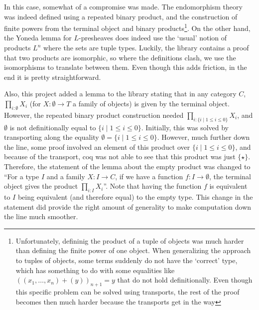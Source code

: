 In this case, somewhat of a compromise was made. The endomorphism theory was indeed defined using a repeated binary product, and the construction of finite powers from the terminal object and binary products\footnote{Unfortunately, defininig the product of a tuple of objects was much harder than defining the finite power of one object. When generalizing the approach to tuples of objects, some terms suddenly do not have the `correct' type, which has something to do with some equalities like $ ((x_1, \dots, x_n) + (y))_{n + 1} = y $ that do not hold definitionally. Even though this specific problem can be solved using transports, the rest of the proof becomes then much harder because the transports get in the way}. On the other hand, the Yoneda lemma for $ L $-presheaves does indeed use the `usual' notion of products $ L^n $ where the sets are tuple types. Luckily, the library contains a proof that two products are isomorphic, so where the definitions clash, we use the isomorphisms to translate between them. Even though this adds friction, in the end it is pretty straightforward.

Also, this project added a lemma to the library stating that in any category $ C $, $ \prod_{i : \emptyset} X_i $ (for $ X : \emptyset \to T $ a family of objects) is given by the terminal object. However, the repeated binary product construction needed $ \prod_{i : \{ i \mid 1 \leq i \leq 0 \}} X_i $, and $ \emptyset $ is not definitionally equal to $ \{ i \mid 1 \leq i \leq 0 \} $. Initially, this was solved by transporting along the equality $ \emptyset = \{ i \mid 1 \leq i \leq 0 \} $. However, much further down the line, some proof involved an element of this product over $ \{ i \mid 1 \leq i \leq 0 \} $, and because of the transport, coq was not able to see that this product was just $ \{ \star \} $. Therefore, the statement of the lemma about the empty product was changed to ``For a type $ I $ and a family $ X : I \to C $, if we have a function $ f : I \to \emptyset $, the terminal object gives the product $ \prod_{i : I} X_i $''. Note that having the function $ f $ is equivalent to $ I $ being equivalent (and therefore equal) to the empty type. This change in the statement did provide the right amount of generality to make computation down the line much smoother.

